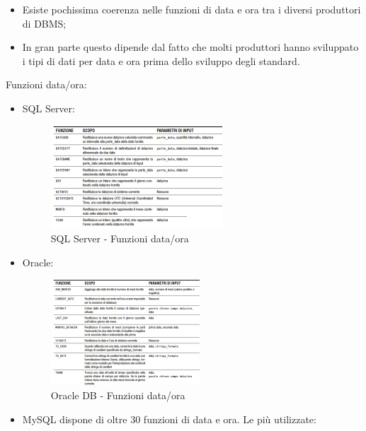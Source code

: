\begin{itemize}
\begin{itemize}

\item Esiste pochissima coerenza nelle funzioni di data e ora tra i diversi produttori di DBMS;
\item In gran parte questo dipende dal fatto che molti produttori hanno sviluppato i tipi di dati per data e ora prima dello sviluppo degli standard.

\end{itemize}

\end{itemize}

Funzioni data/ora:

\begin{itemize}

\item{SQL Server}:

\begin{center}
\begin{figure}[H]
\centering
\includegraphics[scale=1]{figures/SQLserver_time.png}
\caption{SQL Server - Funzioni data/ora} 
\end{figure}
\end{center}

\item{Oracle}:

\begin{center}
\begin{figure}[H]
\centering
\includegraphics[scale=1]{figures/oracle_time.png}
\caption{Oracle DB - Funzioni data/ora} 
\end{figure}
\end{center}

\item{MySQL} dispone di oltre 30 funzioni di data e ora. Le più utilizzate:


\end{itemize}
